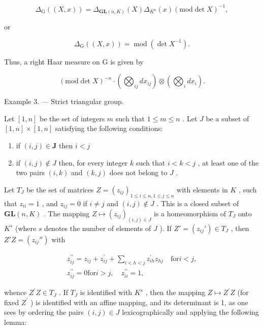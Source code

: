 \[
\Delta_ {\mathrm{G}} ((X, x)) = \Delta_ {\mathbf {G L} (n, K)} (X) \Delta_ {K ^ {n}} (x) (\mathrm{mod} \det X) ^ {- 1},
\]

or

\[
\Delta_ {\mathrm{G}} ((X, x)) = \operatorname{mod} (\det X ^ {- 1}).\tag{6}
\]

Thus, a right Haar measure on G is given by

\[
(\mathrm{mod} \det X) ^ {- n} \cdot \left(\bigotimes_ {i j} d x _ {i j}\right) \otimes \left(\bigotimes_ {i} d x _ {i}\right).\tag{7}
\]

Example 3. --- Strict triangular group.

Let \([1, n]\) be the set of integers \(m\) such that \(1 \leqslant m \leqslant n\) . Let \(J\) be a subset of \([1, n] \times [1, n]\) satisfying the following conditions:

\begin{enumerate}
\def\labelenumi{\arabic{enumi})}
\item
  if \((i,j)\in \mathbf{J}\) then \(i <   j\)
\item
  if \((i,j)\notin J\) then, for every integer \(k\) such that \(i < k < j\) , at least one of the two pairs \((i,k)\) and \((k,j)\) does not belong to \(J\) .
\end{enumerate}

Let \(T_J\) be the set of matrices \(Z = (z_{ij})_{1 \leqslant i \leqslant n, 1 \leqslant j \leqslant n}\) with elements in \(K\) , such that \(z_{ii} = 1\) , and \(z_{ij} = 0\) if \(i \neq j\) and \((i,j) \notin J\) . This is a closed subset of \(\mathbf{GL}(n,K)\) . The mapping \(Z \mapsto (z_{ij})_{(i,j) \in J}\) is a homeomorphism of \(T_J\) onto \(K^s\) (where \(s\) denotes the number of elements of \(J\) ). If \(Z' = (z_{ij}') \in T_J\) , then \(Z'Z = (z_{ij}'')\) with

\[
\begin{array}{c} z _ {i j} ^ {\prime \prime} = z _ {i j} + z _ {i j} ^ {\prime} + \sum_ {i <   h <   j} z _ {i h} ^ {\prime} z _ {h j} \quad \text {for} i <   j, \\ z _ {i j} ^ {\prime \prime} = 0 \text {for} i > j, \quad z _ {i i} ^ {\prime \prime} = 1, \end{array}
\]

whence \(Z^{\prime}Z \in T_{J}\) . If \(T_{J}\) is identified with \(K^{s}\) , then the mapping \(Z \mapsto Z^{\prime}Z\) (for fixed \(Z^{\prime}\) ) is identified with an affine mapping, and its determinant is 1, as one sees by ordering the pairs \((i,j) \in J\) lexicographically and applying the following lemma:

